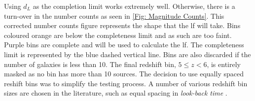 Using $d_L$ as the completion limit works extremely well. Otherwise, there is a turn-over in the number counts as seen in \cref{Fig: Magnitude Counts}. This corrected number counts figure represents the shape that the \gls{lf} will take. Bins coloured orange are below the completeness limit and as such are too faint. Purple bins are complete and will be used to calculate the \gls{lf}. The completeness limit is represented by the blue dashed vertical line. Bins are also discarded if the number of galaxies is less than 10. The final redshift bin, $5 \leq z < 6$, is entirely masked as no bin has more than 10 sources. The decision to use equally spaced reshift bins was to simplify the testing process. A number of various redshift bin sizes are chosen in the literature, such as equal spacing in \textit{look-back time} \citep{thorne_deep_2022}. 